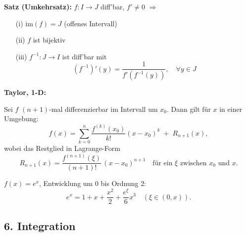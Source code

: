 \textbf{Satz (Umkehrsatz):}  
\(f: I \to J\) diff'bar, \(f' \ne 0\)  
\(\Rightarrow\)
\begin{itemize}
  \item[(i)] \(\text{im}(f) = J\) (offenes Intervall)
  \item[(ii)] \(f\) ist bijektiv
  \item[(iii)] \(f^{-1}: J \to I\) ist diff'bar mit  
    \[
    (f^{-1})'(y) = \frac{1}{f'(f^{-1}(y))}, \quad \forall y \in J
    \]
\end{itemize}

\textbf{Taylor, 1-D:}
\begin{theorem}
  Sei $f$ $(n+1)$-mal differenzierbar im Intervall um $x_0$. Dann gilt für $x$ in einer Umgebung:
  \[
    f(x) = \sum_{k=0}^n \frac{f^{(k)}(x_0)}{k!}(x - x_0)^k 
    \;+\; R_{n+1}(x),
  \]
  wobei das Restglied in Lagrange-Form
  \[
    R_{n+1}(x) = \frac{f^{(n+1)}(\xi)}{(n+1)!}\,(x - x_0)^{n+1}
    \quad\text{für ein }\xi\text{ zwischen }x_0\text{ und }x.
  \]
\end{theorem}
\begin{example}
  $f(x) = e^x$, Entwicklung um $0$ bis Ordnung $2$:
  \[
    e^x = 1 + x + \frac{x^2}{2} + \frac{e^\xi}{6} x^3 \quad(\xi\in(0,x)).
  \]
\end{example}

\subsection{6. Integration}